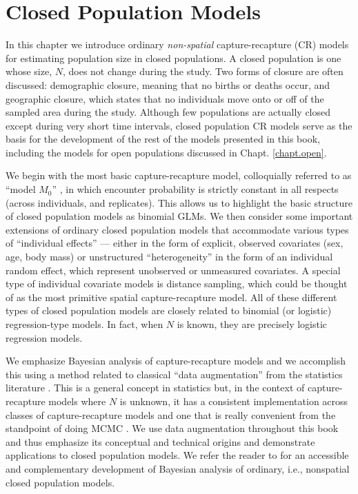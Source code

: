 \chapter{
 Closed Population Models
}
\label{chapt.closed}



\vspace{.3in}

In this chapter we introduce ordinary {\it non-spatial}
capture-recapture (CR) models for estimating population size in closed
populations. A closed population is one whose size, $N$, does not
change during the study. Two forms of closure are often discussed:
demographic closure, meaning that no births or deaths occur, and
geographic closure, which states that no individuals move onto or off
of the sampled area during the study.  Although few populations are actually
closed except during very short time intervals, closed population
CR models serve as the basis for the development of the rest of the
models presented in this book, including the models for open
populations discussed in Chapt. \ref{chapt.open}.

We begin with the most basic
capture-recapture model, colloquially referred to as ``model $M_0$''
\citep{otis_etal:1978}, in which encounter probability is strictly
constant in all respects (across individuals, and replicates).  This
allows us to highlight the basic structure of closed population models
as binomial GLMs.  We then consider some important extensions of
ordinary closed population models that accommodate various types of
``individual effects'' --- either in the form of explicit, observed
covariates (sex, age, body mass) or unstructured ``heterogeneity'' in
the form of an individual random effect, which represent 
unobserved or unmeasured covariates.  A special type of individual
covariate models is distance sampling, which could be thought of as
the most primitive spatial capture-recapture model.  All of these
different types of closed population models are closely related to
binomial (or logistic) regression-type models. In fact, when $N$ is
known, they are precisely logistic regression models.




We emphasize Bayesian analysis of capture-recapture models and we
accomplish this using a method related to classical ``data
augmentation'' from the statistics literature
\citep[e.g.,][]{tanner_wong:1987}.  This is a general concept in
statistics but, in the context of capture-recapture models where $N$
is unknown, it has a consistent implementation across classes of
capture-recapture models and one that is really convenient from the
standpoint of doing MCMC
\citep{royle_etal:2007,royle_dorazio:2012}. We use data augmentation
throughout this book and thus emphasize its conceptual and technical
origins and demonstrate applications to closed population models.  We
refer the reader to \citet[][ch. 6]{kery_schaub:2011} for an
accessible and complementary development of Bayesian analysis of
ordinary, i.e., nonspatial closed population models.


